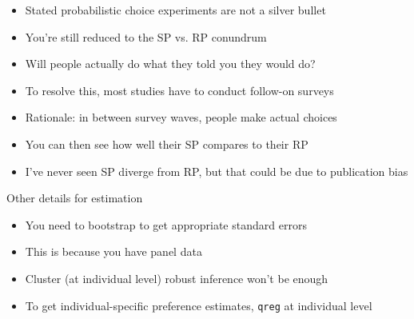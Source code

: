 \documentclass[aspectratio=169]{beamer}
\begin{document}
\begin{frame}
\begin{itemize}
\itemsep1.5em
\item<1-> Stated probabilistic choice experiments are not a silver bullet
\item<2-> You're still reduced to the SP vs. RP conundrum
\item<3-> Will people actually do what they told you they would do?
\item<4-> To resolve this, most studies have to conduct follow-on surveys
\item<5-> Rationale: in between survey waves, people make actual choices
\item<6-> You can then see how well their SP compares to their RP
\item<7-> I've never seen SP diverge from RP, but that could be due to publication bias
\end{itemize}

\end{frame}


\begin{frame}

Other details for estimation

\bigskip

\begin{itemize}
\itemsep1.5em
\item<2-> You need to bootstrap to get appropriate standard errors
\item<3-> This is because you have panel data
\item<4-> Cluster (at individual level) robust inference won't be enough
\item<5-> To get individual-specific preference estimates, \texttt{qreg} at individual level
\end{itemize}

\end{frame}
\end{document}

